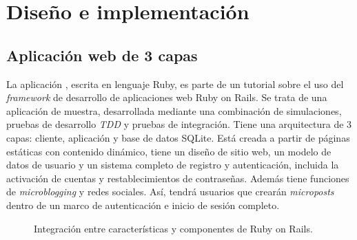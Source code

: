 \chapter{Diseño e implementación}
\label{cha:regulation}

\section{Aplicación web de 3 capas}

La aplicación , escrita en lenguaje Ruby, es parte de un tutorial sobre el uso del \textit{framework} de desarrollo de aplicaciones web Ruby on Rails. Se trata de una aplicación de muestra, desarrollada mediante una combinación de simulaciones, pruebas de desarrollo \textit{TDD} y pruebas de integración. Tiene una arquitectura de 3 capas: cliente, aplicación y base de datos SQLite. Está creada a partir de páginas estáticas con contenido dinámico, tiene un diseño de sitio web, un modelo de datos de usuario y un sistema completo de registro y autenticación, incluida la activación de cuentas y restablecimientos de contraseñas. Además tiene funciones de \textit{microblogging} y redes sociales. Así, tendrá usuarios que crearán \textit{microposts} dentro de un marco de autenticación e inicio de sesión completo.

\begin{figure}[H]
\caption{Integración entre características y componentes de Ruby on Rails.\label{fig:figure_placement_example}}
\end{figure}

